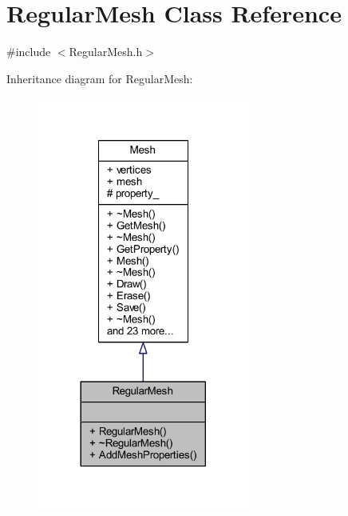 \hypertarget{class_regular_mesh}{}\section{Regular\+Mesh Class Reference}
\label{class_regular_mesh}


{\ttfamily \#include $<$Regular\+Mesh.\+h$>$}



Inheritance diagram for Regular\+Mesh\+:
\nopagebreak
\begin{figure}[H]
\begin{center}
\leavevmode
\includegraphics[width=197pt]{class_regular_mesh__inherit__graph}
\end{center}
\end{figure}



